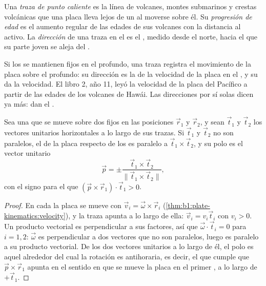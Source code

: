 \begin{definition}\label{def:b1:hotspots:track}
Una \emph{traza de punto caliente} es la línea de volcanes, montes submarinos y crestas volcánicas que una placa lleva lejos de
un  al moverse sobre él. Su \emph{progresión de edad} es el aumento regular de las edades de sus volcanes con la
distancia al activo. La \emph{dirección} de una traza en el  es el , medido desde el norte, hacia el que su parte joven se aleja del .
\end{definition}

Si los  se mantienen fijos en el  profundo, una traza registra el movimiento de la placa sobre el  profundo: su dirección es la de
la velocidad de la placa en el , y su  da la velocidad. El libro 2, año 11, leyó la velocidad de la placa del Pacífico a partir de
las edades de los volcanes de Hawái. Las direcciones por sí solas dicen ya más: dan el .

\begin{proposition}\label{prop:b1:hotspots:two-tracks}
Sea una  que se mueve sobre dos  fijos en las posiciones $\vec r_1$ y $\vec r_2$, y sean $\vec t_1$ y $\vec t_2$ los vectores
unitarios horizontales a lo largo de sus trazas. Si $\vec t_1$ y $\vec t_2$ no son paralelos, el  de la placa respecto de los  es paralelo a $\vec t_1\times\vec t_2$, y su polo es el vector unitario
\[
  \vec p = \pm\frac{\vec t_1\times\vec t_2}{\lVert\vec t_1\times\vec t_2\rVert},
\]
con el signo para el que $(\vec p\times\vec r_1)\cdot\vec t_1 > 0$.
\end{proposition}

\begin{proof}
En cada  la placa se mueve con $\vec v_i = \vec\omega\times\vec r_i$ (\cref{thm:b1:plate-kinematics:velocity}), y la traza apunta a lo
largo de ella: $\vec v_i = v_i\vec t_i$ con $v_i > 0$. Un producto vectorial es perpendicular a sus factores, así que $\vec\omega\cdot\vec t_i = 0$ para
$i = 1, 2$: $\vec\omega$ es perpendicular a dos vectores que no son paralelos, luego es paralelo a su producto vectorial. De los dos vectores
unitarios a lo largo de él, el polo es aquel alrededor del cual la rotación es antihoraria, es decir, el que cumple que $\vec p\times\vec r_1$ apunta
en el sentido en que se mueve la placa en el primer , a lo largo de $+\vec t_1$.
\end{proof}

